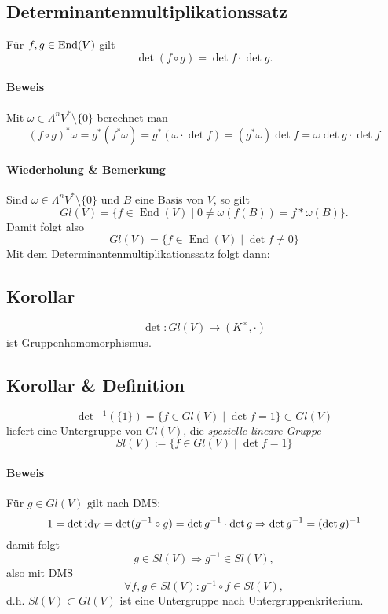 \subsection{Determinantenmultiplikationssatz}
	\begin{Satz}[Determinantenmultiplikationssatz]
		Für $ f,g\in \operatorname{End}(V) $ gilt
			\[ \det(f\circ g) = \det f \cdot \det g. \]
	\end{Satz}
\paragraph{Beweis}
	Mit $ \omega\in\Lambda^nV^*\setminus\{0\} $ berechnet man
		\[ (f\circ g)^*\omega = g^*(f^*\omega) = g^*(\omega\cdot \det f) = (g^*\omega)\det f = \omega \det g\cdot \det f \]
		
\paragraph{Wiederholung \& Bemerkung}
	Sind $ \omega\in \Lambda^nV^*\setminus \{0\} $ und $ B $ eine Basis von $ V $, so gilt
		\[ Gl(V) = \{f\in \operatorname{End}(V)\mid 0\neq \omega(f(B))=f*\omega(B)\}. \]
	Damit folgt also
		\[ Gl(V) = \{f\in\operatorname{End}(V)\mid \det f \neq 0\} \]
	Mit dem Determinantenmultiplikationssatz folgt dann:	
\subsection{Korollar}
\begin{Korollar}
	\[ \det : Gl(V)\to (K^\times,\cdot) \]
	ist Gruppenhomomorphismus.
\end{Korollar}
\subsection{Korollar \& Definition}
\begin{Definition}
	\[ \det\text{}^{-1}(\{1\}) = \{f\in Gl(V)\mid \det f = 1\} \subset Gl(V) \]
	liefert eine Untergruppe von $ Gl(V) $, die \emph{spezielle lineare Gruppe}
	\[ Sl(V):= \{f\in Gl(V)\mid \det f = 1 \} \]
\end{Definition}
\paragraph{Beweis}
	Für $ g\in Gl(V) $ gilt nach DMS:
		\[ 1 = \det \operatorname{id}_V = \det(g^{-1}\circ g) = \det g^{-1}\cdot \det g\Rightarrow \det g^{-1} = (\det g)^{-1} \]
	damit folgt
		\[ g\in Sl(V)\Rightarrow g^{-1} \in Sl(V), \]
	also mit DMS
		\[ \forall f,g\in Sl(V):g^{-1}\circ f\in Sl(V), \]
	d.h. $ Sl(V)\subset Gl(V) $ ist eine Untergruppe nach Untergruppenkriterium.
